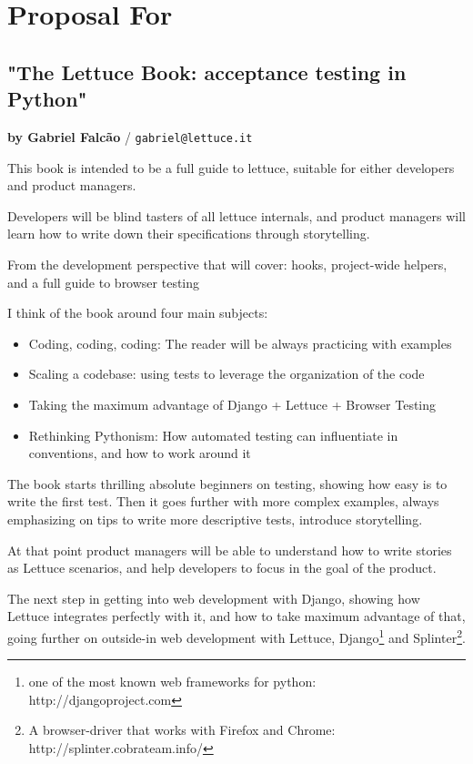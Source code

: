 \documentclass[letterpaper]{article}
\begin{document}
\section*{Proposal For}

\subsection*{"The Lettuce Book: acceptance testing in Python"}
\normalsize\textbf{by Gabriel Falcão} \large{/} \texttt{gabriel@lettuce.it}

\normalsize

This book is intended to be a full guide to lettuce, suitable for
either developers and product managers.

Developers will be blind tasters of all lettuce internals, and product
managers will learn how to write down their specifications through
storytelling.

From the development perspective that will cover: hooks, project-wide
helpers, and a full guide to browser testing

I think of the book around four main subjects:

\begin{itemize}

\item{Coding, coding, coding: The reader will be always practicing with examples}

\item{Scaling a codebase: using tests to leverage the organization of the code}

\item{Taking the maximum advantage of Django + Lettuce + Browser Testing}

\item{Rethinking Pythonism: How automated testing can influentiate in conventions, and how to work around it}
\end{itemize}


The book starts thrilling absolute beginners on testing, showing how easy is to write the first test.
Then it goes further with more complex examples, always emphasizing on
tips to write more descriptive tests, introduce storytelling.

At that point product managers will be able to understand how to write
stories as Lettuce scenarios, and help developers to focus in the goal
of the product.

The next step in getting into web development with Django, showing how
Lettuce integrates perfectly with it, and how to take maximum
advantage of that, going further on outside-in web development with
Lettuce, Django\footnote{one of the most known web frameworks for python: http://djangoproject.com} and Splinter\footnote{A browser-driver that works with Firefox and Chrome: http://splinter.cobrateam.info/}.
\end{document}
